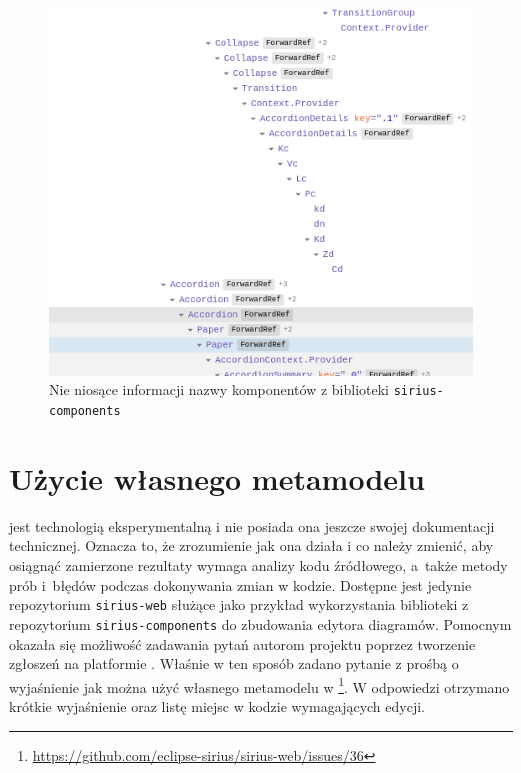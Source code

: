 \begin{figure}[!ht]
  \centering

  \includegraphics[width=0.7\linewidth]{./images/sirius-web-minified-component-names.png}
  \caption{Nie niosące informacji nazwy komponentów z biblioteki
    \texttt{sirius-components}}\label{rys:sirius-web-minified-component-names}
\end{figure}

\section{Użycie własnego metamodelu}

\SiriusWeb{} jest technologią eksperymentalną i nie posiada ona jeszcze
swojej dokumentacji technicznej. Oznacza to, że zrozumienie jak ona działa i co
należy zmienić, aby osiągnąć zamierzone rezultaty wymaga analizy kodu
źródłowego, a~także metody prób i~błędów podczas
dokonywania zmian w
kodzie. Dostępne jest jedynie repozytorium \texttt{sirius-web} służące jako
przykład wykorzystania biblioteki z repozytorium \texttt{sirius-components}
do zbudowania edytora diagramów.
Pomocnym okazała się możliwość zadawania pytań autorom projektu poprzez
tworzenie zgłoszeń na platformie \GitHub{}. Właśnie w ten sposób zadano
pytanie z prośbą o wyjaśnienie jak można użyć własnego metamodelu \EMF{} w
\SiriusWeb{}\footnote{
	\url{https://github.com/eclipse-sirius/sirius-web/issues/36}
}. W odpowiedzi otrzymano krótkie wyjaśnienie oraz listę miejsc w kodzie
wymagających edycji.

